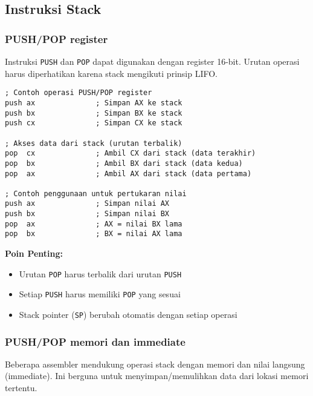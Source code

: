 \documentclass[../main.tex]{subfiles}
\begin{document}
        \subsection{Instruksi Stack}
            \subsubsection{PUSH/POP register}
                Instruksi \texttt{PUSH} dan \texttt{POP} dapat digunakan dengan register 16-bit. Urutan operasi harus diperhatikan karena stack mengikuti prinsip LIFO.

                \begin{lstlisting}[language={[x86masm]Assembler}, caption=Operasi PUSH/POP Register, label={lst:push-pop-register}]
; Contoh operasi PUSH/POP register
push ax              ; Simpan AX ke stack
push bx              ; Simpan BX ke stack  
push cx              ; Simpan CX ke stack

; Akses data dari stack (urutan terbalik)
pop  cx              ; Ambil CX dari stack (data terakhir)
pop  bx              ; Ambil BX dari stack (data kedua)
pop  ax              ; Ambil AX dari stack (data pertama)

; Contoh penggunaan untuk pertukaran nilai
push ax              ; Simpan nilai AX
push bx              ; Simpan nilai BX
pop  ax              ; AX = nilai BX lama
pop  bx              ; BX = nilai AX lama
                \end{lstlisting}

                \textbf{Poin Penting:}
                \begin{itemize}
                    \item Urutan \texttt{POP} harus terbalik dari urutan \texttt{PUSH}
                    \item Setiap \texttt{PUSH} harus memiliki \texttt{POP} yang sesuai
                    \item Stack pointer (\texttt{SP}) berubah otomatis dengan setiap operasi
                \end{itemize}

            \subsubsection{PUSH/POP memori dan immediate}
                Beberapa assembler mendukung operasi stack dengan memori dan nilai langsung (immediate). Ini berguna untuk menyimpan/memulihkan data dari lokasi memori tertentu.
\end{document}
